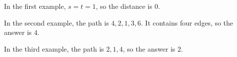 In the first example, $s=t=1$, so the distance is $0$.

In the second example, the path is $4,2,1,3,6$. It contains four edges, so the answer is $4$.

In the third example, the path is $2,1,4$, so the answer is $2$.
